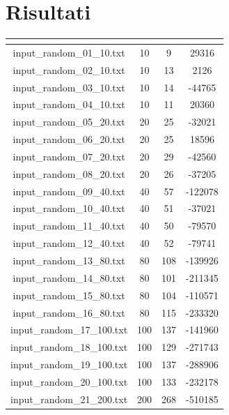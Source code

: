 \section{Risultati}

\renewcommand{\arraystretch}{1.5}
\begin{longtable}{|c|c|c|c|}
	\hline
	\rowcolor{title_row}
	\textbf{\color{title_text}{Input file}} &
	\textbf{\color{title_text}{num\_vertici}} & \textbf{\color{title_text}{num\_archi}} & \textbf{\color{title_text}{MST}}\\
	\hline
	\endhead
	input\_random\_01\_10.txt & 10 & 9 & 29316 \\ \hline 
	input\_random\_02\_10.txt & 10 & 13 & 2126 \\ \hline 
	input\_random\_03\_10.txt & 10 & 14 & -44765 \\ \hline
	input\_random\_04\_10.txt & 10 & 11 & 20360 \\ \hline
	input\_random\_05\_20.txt & 20 & 25 & -32021 \\ \hline
	input\_random\_06\_20.txt & 20 & 25 & 18596 \\ \hline
	input\_random\_07\_20.txt & 20 & 29 & -42560 \\ \hline
	input\_random\_08\_20.txt & 20 & 26 & -37205 \\ \hline
	input\_random\_09\_40.txt & 40 & 57 & -122078 \\ \hline
	input\_random\_10\_40.txt & 40 & 51 & -37021 \\ \hline
	input\_random\_11\_40.txt & 40 & 50 & -79570 \\ \hline
	input\_random\_12\_40.txt & 40 & 52 & -79741 \\ \hline
	input\_random\_13\_80.txt & 80 & 108 & -139926 \\ \hline
	input\_random\_14\_80.txt & 80 & 101 & -211345 \\ \hline
	input\_random\_15\_80.txt & 80 & 104 & -110571 \\ \hline
	input\_random\_16\_80.txt & 80 & 115 & -233320 \\ \hline
	input\_random\_17\_100.txt & 100 & 137 & -141960 \\ \hline
	input\_random\_18\_100.txt & 100 & 129 & -271743 \\ \hline
	input\_random\_19\_100.txt & 100 & 137 & -288906 \\ \hline
	input\_random\_20\_100.txt & 100 & 133 & -232178 \\ \hline
	input\_random\_21\_200.txt & 200 & 268 & -510185 \\ \hline

\end{longtable}
